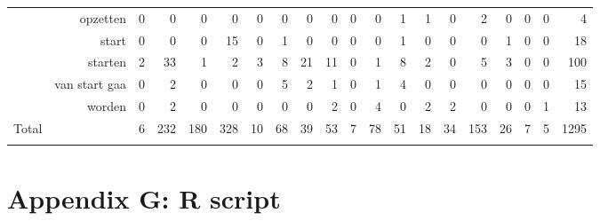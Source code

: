 \begin{table}
{\begin{tabular}{lrrrrrrrrrrrrrrrrrr|r}
& opzetten &  0 &  0 &  0 &  0 &  0 &  0 &  0 &  0 &  0 &  0 &  1 &  1 &  0 &  2 &  0 &  0 &  0 &  4\\
& start &  0 &  0 &  0 &  15 &  0 &  1 &  0 &  0 &  0 &  0 &  1 &  0 &  0 &  0 &  1 &  0 &  0 &  18\\
& starten &  2 &  33 &  1 &  2 &  3 &  8 &  21 &  11 &  0 &  1 &  8 &  2 &  0 &  5 &  3 &  0 &  0 &  100\\
& van start gaa &  0 &  2 &  0 &  0 &  0 &  5 &  2 &  1 &  0 &  1 &  4 &  0 &  0 &  0 &  0 &  0 &  0 &  15\\
& worden &  0 &  2 &  0 &  0 &  0 &  0 &  0 &  2 &  0 &  4 &  0 &  2 &  2 &  0 &  0 &  0 &  1 &  13\\
\hline 
Total & &  6 &  232 &  180 &  328 &  10 &  68 &  39 &  53 &  7 &  78 &  51 &  18 &  34 &  153 &  26 &  7 &  5 &  1295\\
\lspbottomrule
\end{tabular}
}
\end{table} 

\newpage
\section*{Appendix G: R script}


